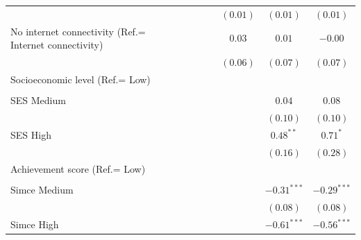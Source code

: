 \documentclass[
  12pt,
  letterpaper,
]{article}
\begin{document}
\begin{table}
{\begin{center}
{\begin{threeparttable}
\begin{tabular}{l c c c c c c}
                                                       &               &               &               & $(0.01)$      & $(0.01)$      & $(0.01)$      \\
No internet connectivity (Ref.= Internet connectivity) &               &               &               & $0.03$        & $0.01$        & $-0.00$       \\
                                                       &               &               &               & $(0.06)$      & $(0.07)$      & $(0.07)$      \\
Socioeconomic level (Ref.= Low)                        &               &               &               &               &               &               \\
                                                       &               &               &               &               &               &               \\
\quad SES Medium                                       &               &               &               &               & $0.04$        & $0.08$        \\
                                                       &               &               &               &               & $(0.10)$      & $(0.10)$      \\
\quad SES High                                         &               &               &               &               & $0.48^{**}$   & $0.71^{*}$    \\
                                                       &               &               &               &               & $(0.16)$      & $(0.28)$      \\
Achievement score (Ref.= Low)                          &               &               &               &               &               &               \\
                                                       &               &               &               &               &               &               \\
\quad Simce Medium                                     &               &               &               &               & $-0.31^{***}$ & $-0.29^{***}$ \\
                                                       &               &               &               &               & $(0.08)$      & $(0.08)$      \\
\quad Simce High                                       &               &               &               &               & $-0.61^{***}$ & $-0.56^{***}$ \\

\end{tabular}
\end{threeparttable}}
\end{center}}
\end{table}
\end{document}
